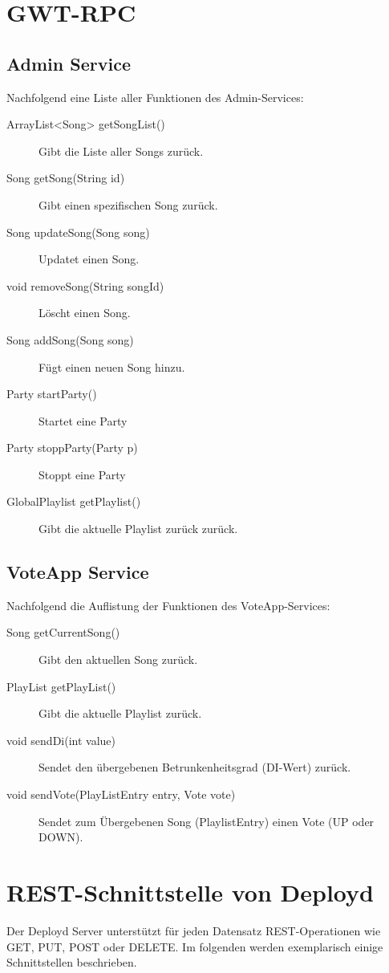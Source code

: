 \section{GWT-RPC}

\subsection{Admin Service}
Nachfolgend eine Liste aller Funktionen des Admin-Services:
\begin{description}
	\item[ArrayList<Song> getSongList()] Gibt die Liste aller Songs zurück.
	\item[Song getSong(String id)] Gibt einen spezifischen Song zurück.
	\item[Song updateSong(Song song)] Updatet einen Song.
	\item[void removeSong(String songId)]	Löscht einen Song.
	\item[Song addSong(Song song)] Fügt einen neuen Song hinzu.
	\item[Party startParty()]	Startet eine Party
	\item[Party stoppParty(Party p)] Stoppt eine Party
	\item[GlobalPlaylist getPlaylist()] Gibt die aktuelle Playlist zurück zurück.
\end{description}


\subsection{VoteApp Service}
Nachfolgend die Auflistung der Funktionen des VoteApp-Services:
\begin{description}
	\item[Song getCurrentSong()] Gibt den aktuellen Song zurück.
	\item[PlayList getPlayList()]	Gibt die aktuelle Playlist zurück.
	\item[void sendDi(int value)] Sendet den übergebenen Betrunkenheitsgrad (DI-Wert) zurück.
	\item[void sendVote(PlayListEntry entry, Vote vote)] Sendet zum Übergebenen Song (PlaylistEntry) einen Vote (UP oder DOWN).
\end{description}

\section{REST-Schnittstelle von Deployd}

Der Deployd Server unterstützt für jeden Datensatz REST-Operationen wie GET, PUT, POST oder DELETE. Im folgenden werden exemplarisch einige Schnittstellen beschrieben.

